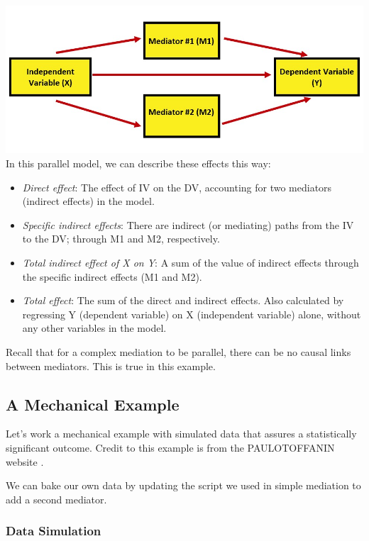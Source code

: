 \documentclass[
  11pt,
]{book}
\providecommand{\tightlist}{%
  \setlength{\itemsep}{0pt}\setlength{\parskip}{0pt}}
\begin{document}
\includegraphics{images/CompMed/ParaMed.jpg} In this parallel model, we can describe these effects this way:

\begin{itemize}
\tightlist
\item
  \emph{Direct effect}: The effect of IV on the DV, accounting for two mediators (indirect effects) in the model.
\item
  \emph{Specific indirect effects}: There are indirect (or mediating) paths from the IV to the DV; through M1 and M2, respectively.
\item
  \emph{Total indirect effect of X on Y}: A sum of the value of indirect effects through the specific indirect effects (M1 and M2).
\item
  \emph{Total effect}: The sum of the direct and indirect effects. Also calculated by regressing Y (dependent variable) on X (independent variable) alone, without any other variables in the model.
\end{itemize}

Recall that for a complex mediation to be parallel, there can be no causal links between mediators. This is true in this example.

\hypertarget{a-mechanical-example}{%
\subsection{A Mechanical Example}\label{a-mechanical-example}}

Let's work a mechanical example with simulated data that assures a statistically significant outcome. Credit to this example is from the PAULOTOFFANIN website \citep{toffanin_multiple-mediator_2017}.

We can bake our own data by updating the script we used in simple mediation to add a second mediator.

\hypertarget{data-simulation-1}{%
\subsubsection{Data Simulation}\label{data-simulation-1}}
\end{document}
